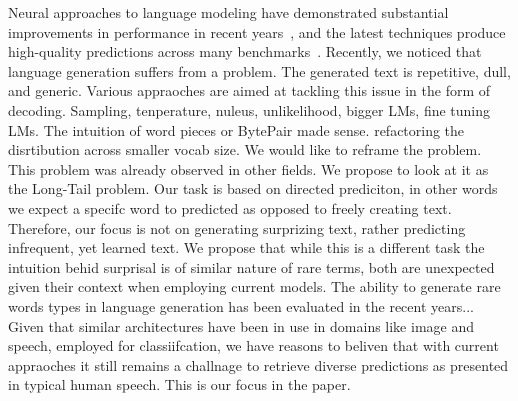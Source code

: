 \documentclass[11pt,a4paper]{article}
\begin{document}
 Neural approaches to language modeling have demonstrated substantial improvements in performance in recent years~\citep{melis2018on,merity2018regularizing}, and the latest techniques produce high-quality predictions across many benchmarks~\cite{peters2018deep,devlin2018bert}. %
 Recently, we noticed that language generation suffers from a problem. The generated text is repetitive, dull, and generic. Various appraoches are aimed at tackling this issue in the form of decoding. Sampling, tenperature, nuleus, unlikelihood, bigger LMs, fine tuning LMs.
 The intuition of word pieces or BytePair made sense. refactoring the disrtibution across smaller vocab size. We would like to reframe the problem. This problem was already observed in other fields. We propose to look at it as the Long-Tail problem. Our task is based on directed prediciton, in other words we expect a specifc word to predicted as opposed to freely creating text. Therefore, our focus is not on generating surprizing text, rather predicting infrequent, yet learned text. We propose that while this is a different task the intuition behid surprisal is of similar nature of rare terms, both are unexpected given their context when employing current models. The ability to generate rare words types in language generation has been evaluated in the recent years...
 Given that similar architectures have been in use in domains like image and speech, employed for classiifcation, we have reasons to beliven that with current appraoches it still remains a challnage to retrieve diverse predictions as presented in typical human speech. This is our focus in the paper. 
\end{document}
